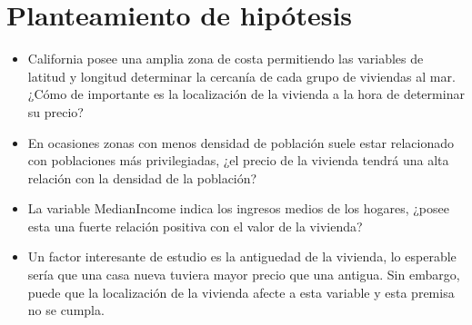 \section{Planteamiento de hipótesis}
\begin{itemize}
	\item California posee una amplia zona de costa permitiendo las variables de latitud y longitud determinar la cercanía de cada grupo de viviendas al mar. ¿Cómo de importante es la localización de la vivienda a la hora de determinar su precio?
	
	\item En ocasiones zonas con menos densidad de población suele estar relacionado con poblaciones más privilegiadas, ¿el precio de la vivienda tendrá una alta relación con la densidad de la población?
	
	\item La variable MedianIncome indica los ingresos medios de los hogares, ¿posee esta una fuerte relación positiva con el valor de la vivienda?
	
	\item Un factor interesante de estudio es la antiguedad de la vivienda, lo esperable sería que una casa nueva tuviera mayor precio que una antigua. Sin embargo, puede que la localización de la vivienda afecte a esta variable y esta premisa no se cumpla.
\end{itemize}


